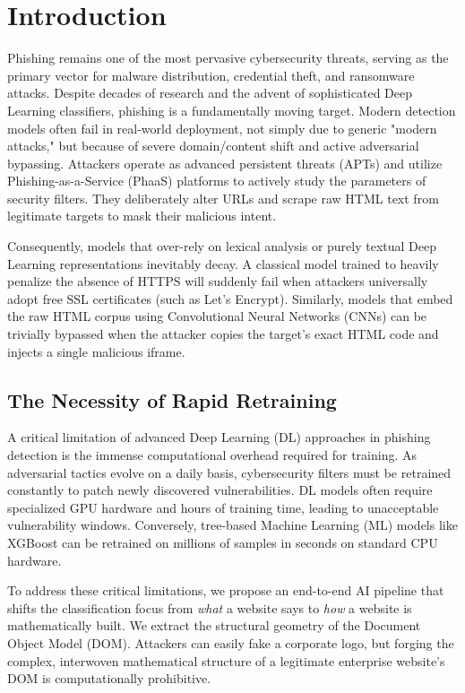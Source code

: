 \documentclass[conference]{IEEEtran}
\begin{document}
\section{Introduction}
Phishing remains one of the most pervasive cybersecurity threats, serving as the primary vector for malware distribution, credential theft, and ransomware attacks. Despite decades of research and the advent of sophisticated Deep Learning classifiers, phishing is a fundamentally moving target. Modern detection models often fail in real-world deployment, not simply due to generic "modern attacks," but because of severe domain/content shift and active adversarial bypassing. Attackers operate as advanced persistent threats (APTs) and utilize Phishing-as-a-Service (PhaaS) platforms to actively study the parameters of security filters. They deliberately alter URLs and scrape raw HTML text from legitimate targets to mask their malicious intent.

Consequently, models that over-rely on lexical analysis or purely textual Deep Learning representations inevitably decay. A classical model trained to heavily penalize the absence of HTTPS will suddenly fail when attackers universally adopt free SSL certificates (such as Let's Encrypt). Similarly, models that embed the raw HTML corpus using Convolutional Neural Networks (CNNs) can be trivially bypassed when the attacker copies the target's exact HTML code and injects a single malicious iframe.

\subsection{The Necessity of Rapid Retraining}
A critical limitation of advanced Deep Learning (DL) approaches in phishing detection is the immense computational overhead required for training. As adversarial tactics evolve on a daily basis, cybersecurity filters must be retrained constantly to patch newly discovered vulnerabilities. DL models often require specialized GPU hardware and hours of training time, leading to unacceptable vulnerability windows. Conversely, tree-based Machine Learning (ML) models like XGBoost can be retrained on millions of samples in seconds on standard CPU hardware.

To address these critical limitations, we propose an end-to-end AI pipeline that shifts the classification focus from \textit{what} a website says to \textit{how} a website is mathematically built. We extract the structural geometry of the Document Object Model (DOM). Attackers can easily fake a corporate logo, but forging the complex, interwoven mathematical structure of a legitimate enterprise website's DOM is computationally prohibitive. 
\end{document}
